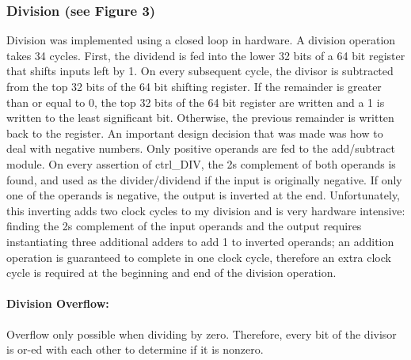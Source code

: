\documentclass[letterpaper]{article}
\begin{document}
\subsubsection{Division (see Figure 3)}
Division was implemented using a closed loop in hardware. A division operation takes 34 cycles. First, the dividend is fed into the lower 32 bits of a 64 bit register that shifts inputs left by 1. On every subsequent cycle, the divisor is subtracted from the top 32 bits of the 64 bit shifting register. If the remainder is greater than or equal to 0, the top 32 bits of the 64 bit register are written and a 1 is written to the least significant bit. Otherwise, the previous remainder is written back to the register. \newline
An important design decision that was made was how to deal with negative numbers. Only positive operands are fed to the add/subtract module. On every assertion of ctrl\_DIV, the 2s complement of both operands is found, and used as the divider/dividend if the input is originally negative. If only one of the operands is negative, the output is inverted at the end. Unfortunately, this inverting adds two clock cycles to my division and is very hardware intensive: finding the 2s complement of the input operands and the output requires instantiating three additional adders to add 1 to inverted operands; an addition operation is guaranteed to complete in one clock cycle, therefore an extra clock cycle is required at the beginning and end of the division operation. 

\paragraph{Division Overflow:}
Overflow only possible when dividing by zero. Therefore, every bit of the divisor is or-ed with each other to determine if it is nonzero.
\newline
\end{document}
